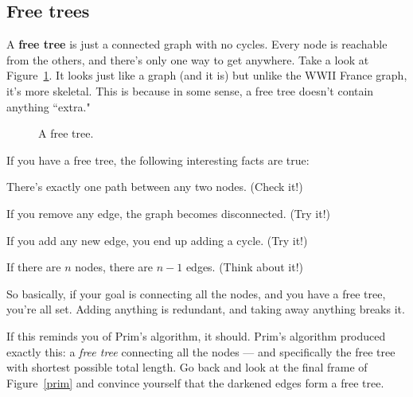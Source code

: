 \subsection{Free trees}

A \textbf{free tree} is just a connected graph with no cycles. Every node
is reachable from the others, and there's only one way to get anywhere.
Take a look at Figure~\ref{freetree}. It looks just like a graph (and it
is) but unlike the WWII France graph, it's more skeletal. This is because
in some sense, a free tree doesn't contain anything ``extra."

\begin{figure}[ht]
\centering
\begin{custommargins}{-2.1cm}{-3cm}
\caption{A free tree.}
\label{freetree}
\end{custommargins}
\end{figure}

If you have a free tree, the following interesting facts are true:

\begin{compactenum}
\item There's exactly one path between any two nodes. (Check it!)
\item If you remove any edge, the graph becomes disconnected. (Try it!)
\item If you add any new edge, you end up adding a cycle. (Try it!)
\item \label{onelessedge} If there are $n$ nodes, there are $n-1$ edges. (Think about it!)
\end{compactenum}

So basically, if your goal is connecting all the nodes, and you have a free
tree, you're all set. Adding anything is redundant, and taking away
anything breaks it.

If this reminds you of Prim's algorithm, it should. Prim's algorithm
produced exactly this: a \textit{free tree} connecting all the nodes ---
and specifically the free tree with shortest possible total length. Go back
and look at the final frame of Figure~\ref{prim} and convince yourself that
the darkened edges form a free tree.

